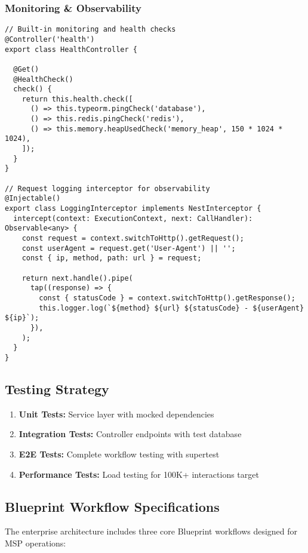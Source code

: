 \subsubsection{Monitoring \& Observability}
\begin{verbatim}
// Built-in monitoring and health checks
@Controller('health')
export class HealthController {
  
  @Get()
  @HealthCheck()
  check() {
    return this.health.check([
      () => this.typeorm.pingCheck('database'),
      () => this.redis.pingCheck('redis'),
      () => this.memory.heapUsedCheck('memory_heap', 150 * 1024 * 1024),
    ]);
  }
}

// Request logging interceptor for observability
@Injectable()
export class LoggingInterceptor implements NestInterceptor {
  intercept(context: ExecutionContext, next: CallHandler): Observable<any> {
    const request = context.switchToHttp().getRequest();
    const userAgent = request.get('User-Agent') || '';
    const { ip, method, path: url } = request;
    
    return next.handle().pipe(
      tap((response) => {
        const { statusCode } = context.switchToHttp().getResponse();
        this.logger.log(`${method} ${url} ${statusCode} - ${userAgent} ${ip}`);
      }),
    );
  }
}
\end{verbatim}

\subsection{Testing Strategy}
\begin{enumerate}
\item \textbf{Unit Tests:} Service layer with mocked dependencies
\item \textbf{Integration Tests:} Controller endpoints with test database
\item \textbf{E2E Tests:} Complete workflow testing with supertest
\item \textbf{Performance Tests:} Load testing for 100K+ interactions target
\end{enumerate} 

\subsection{Blueprint Workflow Specifications}

The enterprise architecture includes three core Blueprint workflows designed for MSP operations:

